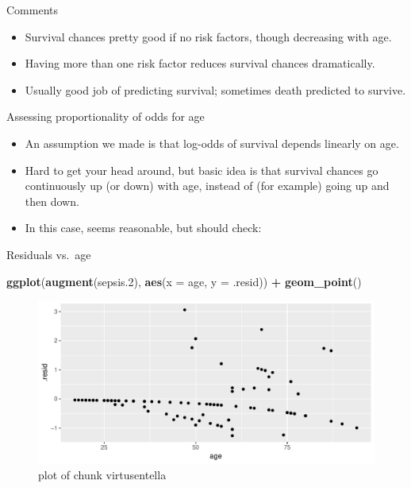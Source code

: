\documentclass[ignorenonframetext,]{beamer}
\newenvironment{Shaded}{\begin{snugshade}}{\end{snugshade}}
\newcommand{\DataTypeTok}[1]{\textcolor[rgb]{0.13,0.29,0.53}{#1}}
\newcommand{\FloatTok}[1]{\textcolor[rgb]{0.00,0.00,0.81}{#1}}
\newcommand{\KeywordTok}[1]{\textcolor[rgb]{0.13,0.29,0.53}{\textbf{#1}}}
\newcommand{\NormalTok}[1]{#1}
\newcommand{\OperatorTok}[1]{\textcolor[rgb]{0.81,0.36,0.00}{\textbf{#1}}}
\newcommand{\StringTok}[1]{\textcolor[rgb]{0.31,0.60,0.02}{#1}}
\begin{document}
\begin{frame}{Comments}
\protect\hypertarget{comments-12}{}

\begin{itemize}
\item
  Survival chances pretty good if no risk factors, though decreasing
  with age.
\item
  Having more than one risk factor reduces survival chances
  dramatically.
\item
  Usually good job of predicting survival; sometimes death predicted to
  survive.
\end{itemize}

\end{frame}

\begin{frame}{Assessing proportionality of odds for age}
\protect\hypertarget{assessing-proportionality-of-odds-for-age}{}

\begin{itemize}
\item
  An assumption we made is that log-odds of survival depends linearly on
  age.
\item
  Hard to get your head around, but basic idea is that survival chances
  go continuously up (or down) with age, instead of (for example) going
  up and then down.
\item
  In this case, seems reasonable, but should check:
\end{itemize}

\end{frame}

\begin{frame}[fragile]{Residuals vs.~age}
\protect\hypertarget{residuals-vs.age}{}

\begin{Shaded}
\begin{Highlighting}[]
\KeywordTok{ggplot}\NormalTok{(}\KeywordTok{augment}\NormalTok{(sepsis}\FloatTok{.2}\NormalTok{), }\KeywordTok{aes}\NormalTok{(}\DataTypeTok{x =}\NormalTok{ age, }\DataTypeTok{y =}\NormalTok{ .resid)) }\OperatorTok{+}
\StringTok{  }\KeywordTok{geom_point}\NormalTok{()}
\end{Highlighting}
\end{Shaded}

\begin{figure}
\centering
\includegraphics{figure/virtusentella-1.pdf}
\caption{plot of chunk virtusentella}
\end{figure}

\end{frame}
\end{document}
